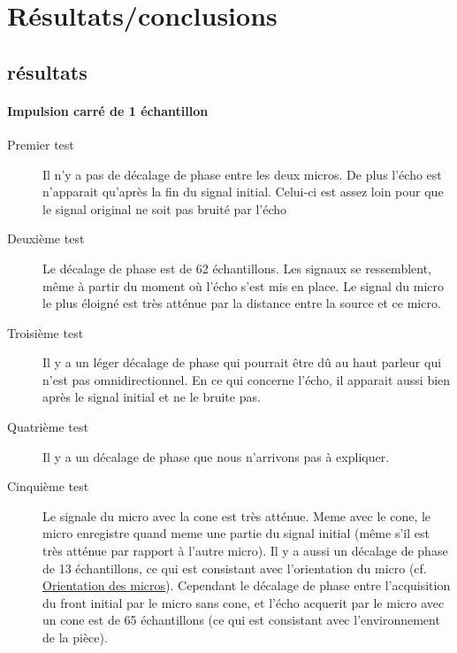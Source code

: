 \section{Résultats/conclusions}
\subsection{résultats}
\paragraph{Impulsion carré de 1 échantillon}
\begin{description}
\item[Premier test] Il n'y a pas de décalage de phase entre les deux micros. De plus l'écho est n'apparait qu'après la fin du signal initial. Celui-ci est assez loin pour que le signal original ne soit pas bruité par l'écho
\item[Deuxième test] \label{test1sample1} Le décalage de phase est de 62 échantillons. Les signaux se ressemblent, même à partir du moment où l'écho s'est mis en place. Le signal du micro le plus éloigné est très atténue par la distance entre la source et ce micro.
\item[Troisième test] Il y a un léger décalage de phase qui pourrait être dû au haut parleur qui n'est pas omnidirectionnel. En ce qui concerne l'écho, il apparait aussi bien après le signal initial et ne le bruite pas.
\item[Quatrième test] Il y a un décalage de phase que nous n'arrivons pas à expliquer.
\item[Cinquième test] Le signale du micro avec la cone est très atténue. Meme avec le cone, le micro enregistre quand meme une partie du signal initial (même s'il est très atténue par rapport à l'autre micro). Il y a aussi un décalage de phase de 13 échantillons, ce qui est consistant avec l'orientation du micro (cf. \hyperref[orientation_micro]{Orientation des micros}). Cependant le décalage de phase entre l'acquisition du front initial par le micro sans cone, et l'écho acquerit par le micro avec un cone est de 65 échantillons (ce qui est consistant avec l'environnement de la pièce).
\end{description}

